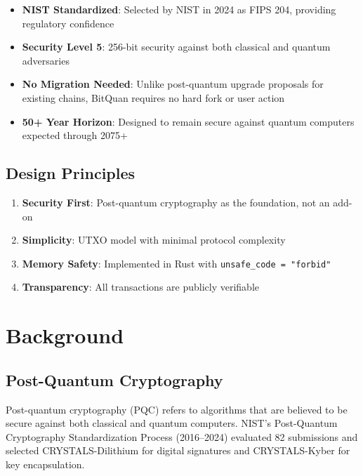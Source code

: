 \documentclass[11pt,a4paper]{article}
\begin{document}
\begin{itemize}[leftmargin=*]
    \item \textbf{NIST Standardized}: Selected by NIST in 2024 as FIPS 204, providing regulatory confidence
    \item \textbf{Security Level 5}: 256-bit security against both classical and quantum adversaries
    \item \textbf{No Migration Needed}: Unlike post-quantum upgrade proposals for existing chains, BitQuan requires no hard fork or user action
    \item \textbf{50+ Year Horizon}: Designed to remain secure against quantum computers expected through 2075+
\end{itemize}

\subsection{Design Principles}

\begin{enumerate}[leftmargin=*]
    \item \textbf{Security First}: Post-quantum cryptography as the foundation, not an add-on
    \item \textbf{Simplicity}: UTXO model with minimal protocol complexity
    \item \textbf{Memory Safety}: Implemented in Rust with \texttt{unsafe\_code = "forbid"}
    \item \textbf{Transparency}: All transactions are publicly verifiable
\end{enumerate}

\section{Background}

\subsection{Post-Quantum Cryptography}

Post-quantum cryptography (PQC) refers to algorithms that are believed to be secure against both classical and quantum computers. NIST's Post-Quantum Cryptography Standardization Process (2016--2024) evaluated 82 submissions and selected CRYSTALS-Dilithium for digital signatures and CRYSTALS-Kyber for key encapsulation.
\end{document}
